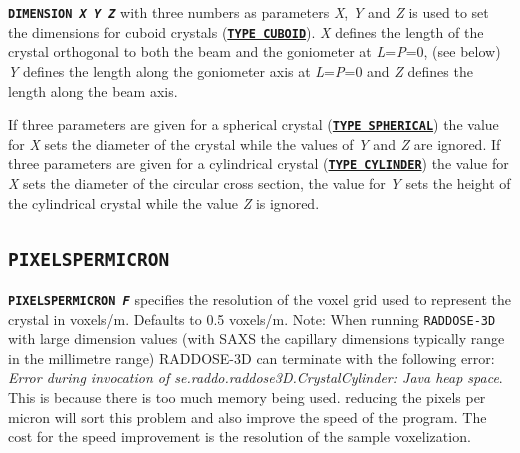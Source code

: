 \documentclass[a4paper]{article}
\newcommand{\RD}{\texttt{RADDOSE-3D}\xspace}
\newcommand{\Keyword}[1]{\texttt{\textbf{#1}}\xspace}
\begin{document}
\noindent \Keyword{DIMENSION \textit{X Y Z}} with three numbers as parameters \textit{X}, \textit{Y} and \textit{Z} is used to set the dimensions for cuboid crystals (\hyperref[crystaltype]{\Keyword{TYPE CUBOID}}).
\textit{X} defines the length of the crystal orthogonal to both the beam and the goniometer at \textit{L}=\textit{P}=0, (see below)
\textit{Y} defines the length along the goniometer axis at \textit{L}=\textit{P}=0 and
\textit{Z} defines the length along the beam axis.

If three parameters are given for a spherical crystal (\hyperref[crystaltype]{\Keyword{TYPE SPHERICAL}}) the value for \textit{X} sets the diameter of the crystal while the values of \textit{Y} and \textit{Z} are ignored.
If three parameters are given for a cylindrical crystal (\hyperref[crystaltype]{\Keyword{TYPE CYLINDER}}) the value for \textit{X} sets the diameter of the circular cross section, the value for \textit{Y} sets the height of the cylindrical crystal while the value \textit{Z} is ignored.

%
%
%
%
%
%
%


\subsection{\Keyword{PIXELSPERMICRON}}

\noindent \Keyword{PIXELSPERMICRON \textit{F}}
specifies the resolution of the voxel grid used to represent the crystal in voxels/\hbox{\textmu}m. Defaults to 0.5 voxels/\hbox{\textmu}m.
\newline
Note: When running \RD with large dimension values (with SAXS the capillary dimensions typically range in the millimetre range) RADDOSE-3D can terminate with the following error:
\newline
\textit{Error during invocation of se.raddo.raddose3D.CrystalCylinder: Java heap space}.
\newline
This is because there is too much memory being used. reducing the pixels per micron will sort this problem and also improve the speed of the program. The cost for the speed improvement is the resolution of the sample voxelization.
\end{document}
